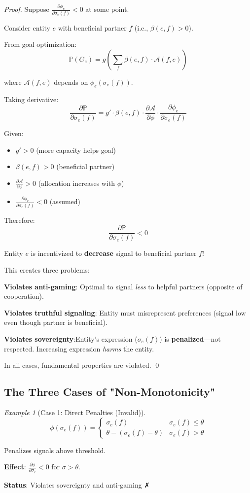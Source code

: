 \documentclass[11pt,a4paper]{article}
\theoremstyle{definition}
\theoremstyle{remark}
\newtheorem{example}[theorem]{Example}
\newcommand{\A}{\mathcal{A}}
\begin{document}
\begin{proof}
Suppose $\frac{\partial \phi_e}{\partial \sigma_e(f)} < 0$ at some point.

Consider entity $e$ with beneficial partner $f$ (i.e., $\beta(e,f) > 0$).

From goal optimization:
\[ \mathbb{P}(G_e) = g\left(\sum_f \beta(e,f) \cdot \A(f,e)\right) \]

where $\A(f,e)$ depends on $\phi_e(\sigma_e(f))$.

Taking derivative:
\[ \frac{\partial \mathbb{P}}{\partial \sigma_e(f)} = g' \cdot \beta(e,f) \cdot \frac{\partial \A}{\partial \phi} \cdot \frac{\partial \phi_e}{\partial \sigma_e(f)} \]

Given:
\begin{itemize}
\item $g' > 0$ (more capacity helps goal)
\item $\beta(e,f) > 0$ (beneficial partner)
\item $\frac{\partial \A}{\partial \phi} > 0$ (allocation increases with $\phi$)
\item $\frac{\partial \phi_e}{\partial \sigma_e(f)} < 0$ (assumed)
\end{itemize}

Therefore:
\[ \frac{\partial \mathbb{P}}{\partial \sigma_e(f)} < 0 \]

Entity $e$ is incentivized to \textbf{decrease} signal to beneficial partner $f$!

This creates three problems:

\textbf{Violates anti-gaming}: Optimal to signal \textit{less} to helpful partners (opposite of cooperation).

\textbf{Violates truthful signaling}: Entity must misrepresent preferences (signal low even though partner is beneficial).

\textbf{Violates sovereignty}:Entity's expression ($\sigma_e(f)$) is \textbf{penalized}—not respected. Increasing expression \textit{harms} the entity.

In all cases, fundamental properties are violated. \qed
\end{proof}

\subsection{The Three Cases of "Non-Monotonicity"}

\begin{example}[Case 1: Direct Penalties (Invalid)]
\[ \phi(\sigma_e(f)) = \begin{cases}
\sigma_e(f) & \sigma_e(f) \le \theta \\
\theta - (\sigma_e(f) - \theta) & \sigma_e(f) > \theta
\end{cases} \]

Penalizes signals above threshold.

\textbf{Effect}: $\frac{\partial \phi}{\partial \sigma_e} < 0$ for $\sigma > \theta$.

\textbf{Status}: Violates sovereignty and anti-gaming ✗
\end{example}
\end{document}
